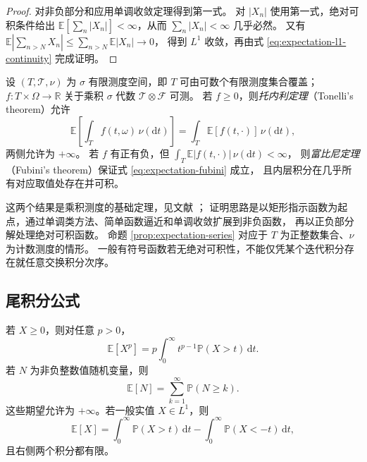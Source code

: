 \documentclass[UTF8,12pt,a4paper,fontset=fandol]{ctexart}
\begin{document}
\begin{proof}
对非负部分和应用单调收敛定理得到第一式。
对 $|X_n|$ 使用第一式，绝对可积条件给出
$\mathbb E[\sum_n|X_n|]<\infty$，从而 $\sum_n|X_n|<\infty$ 几乎必然。
又有
$\mathbb E|\sum_{n>N}X_n|\leq\sum_{n>N}\mathbb E|X_n|\to0$，
得到 $L^1$ 收敛，再由式 \eqref{eq:expectation-l1-continuity} 完成证明。
\end{proof}

\begin{theorem}
\label{thm:expectation-fubini}
设 $(T,\mathcal T,\nu)$ 为 $\sigma$ 有限测度空间，即 $T$ 可由可数个有限测度集合覆盖；
$f:T\times\Omega\to\mathbb R$ 关于乘积 $\sigma$ 代数 $\mathcal T\otimes\mathcal F$ 可测。
若 $f\geq0$，则\emph{托内利定理}（Tonelli's theorem）允许
\begin{equation}
  \mathbb E\!\left[\int_T f(t,\omega)\,\nu(\mathrm dt)\right]
  =\int_T\mathbb E[f(t,\cdot)]\,\nu(\mathrm dt),
  \label{eq:expectation-fubini}
\end{equation}
两侧允许为 $+\infty$。
若 $f$ 有正有负，但
$\int_T\mathbb E|f(t,\cdot)|\,\nu(\mathrm dt)<\infty$，
则\emph{富比尼定理}（Fubini's theorem）保证式 \eqref{eq:expectation-fubini} 成立，
且内层积分在几乎所有对应取值处存在并可积。
\end{theorem}

这两个结果是乘积测度的基础定理，见文献 \cite[第 1.7 节]{durrett-pte}；
证明思路是以矩形指示函数为起点，通过单调类方法、简单函数逼近和单调收敛扩展到非负函数，
再以正负部分解处理绝对可积函数。
命题 \ref{prop:expectation-series} 对应于 $T$ 为正整数集合、$\nu$ 为计数测度的情形。
一般有符号函数若无绝对可积性，不能仅凭某个迭代积分存在就任意交换积分次序。

\subsection{尾积分公式}

\begin{proposition}[由尾概率计算期望与矩]
\label{prop:expectation-tail-integral}
若 $X\geq0$，则对任意 $p>0$，
\begin{equation}
  \mathbb E[X^p]
  =p\int_0^\infty t^{p-1}\mathbb P(X>t)\,\mathrm dt.
  \label{eq:expectation-tail-integral}
\end{equation}
若 $N$ 为非负整数值随机变量，则
\[
  \mathbb E[N]=\sum_{k=1}^\infty\mathbb P(N\geq k).
\]
这些期望允许为 $+\infty$。若一般实值 $X\in L^1$，则
\[
  \mathbb E[X]
  =\int_0^\infty\mathbb P(X>t)\,\mathrm dt
   -\int_0^\infty\mathbb P(X<-t)\,\mathrm dt,
\]
且右侧两个积分都有限。
\end{proposition}
\end{document}
